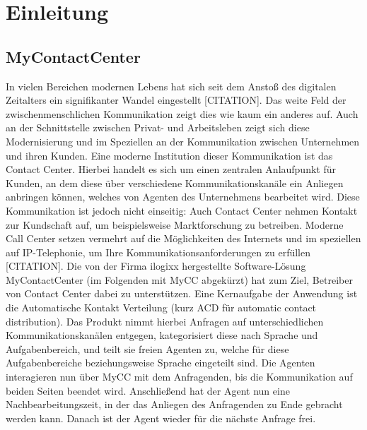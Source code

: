 \chapter{Einleitung}
\label{chap:Einleitung}

\section{MyContactCenter}
In vielen Bereichen modernen Lebens hat sich seit dem Anstoß des digitalen Zeitalters ein signifikanter Wandel eingestellt [CITATION]. Das weite Feld  der zwischenmenschlichen Kommunikation zeigt dies wie kaum ein anderes auf. Auch an der Schnittstelle zwischen Privat- und Arbeitsleben zeigt sich diese Modernisierung und im Speziellen an der Kommunikation zwischen Unternehmen und ihren Kunden. Eine moderne Institution dieser Kommunikation ist das Contact Center. Hierbei handelt es sich um einen zentralen Anlaufpunkt für Kunden, an dem diese über verschiedene Kommunikationskanäle ein Anliegen anbringen können, welches von Agenten des Unternehmens bearbeitet wird. Diese Kommunikation ist jedoch nicht einseitig: Auch Contact Center nehmen Kontakt zur Kundschaft auf, um beispielsweise Marktforschung zu betreiben. 
\newline
Moderne Call Center setzen vermehrt auf die Möglichkeiten des Internets und im speziellen auf IP-Telephonie, um Ihre Kommunikationsanforderungen zu erfüllen [CITATION]. Die von der Firma ilogixx hergestellte Software-Lösung MyContactCenter (im Folgenden mit MyCC abgekürzt) hat zum Ziel, Betreiber von Contact Center dabei zu unterstützen. Eine Kernaufgabe der Anwendung ist die Automatische Kontakt Verteilung (kurz ACD für automatic contact distribution). Das Produkt nimmt hierbei Anfragen auf unterschiedlichen Kommunikationskanälen entgegen, kategorisiert diese nach Sprache und Aufgabenbereich, und teilt sie freien Agenten zu, welche für diese Aufgabenbereiche beziehungsweise Sprache eingeteilt sind. Die Agenten interagieren nun über MyCC mit dem Anfragenden, bis die Kommunikation auf beiden Seiten beendet wird. Anschließend hat der Agent nun eine Nachbearbeitungszeit, in der das Anliegen des Anfragenden zu Ende gebracht werden kann. Danach ist der Agent wieder für die nächste Anfrage frei.
\newline
